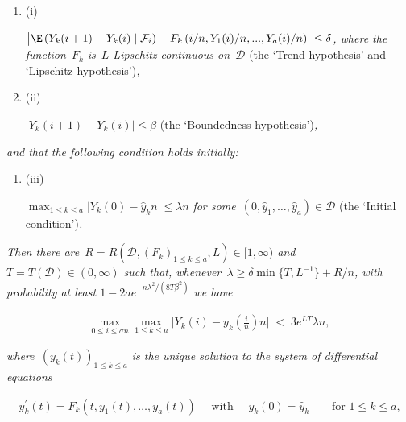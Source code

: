 \documentclass[10pt,a4paper]{article}
\begin{document}
\begin{enumerate}


\item[] (i) 


$\bigl|\E\left(Y_{k}(i+1)-Y_{k}(i)\mid\mathcal{F}_{i}\right)-F_{k}\left(i/n,Y_{1}(i)/n,...,Y_{a}(i)/n\right)\bigr|\leq\delta$\emph{,
where the function }$F_{k}$\emph{ is }$L$\emph{-Lipschitz-continuous on }$\mathcal{D}$\emph{  }(the ‘Trend hypothesis’ and ‘Lipschitz hypothesis’)\emph{,}\par




\item[] (ii) 


$\bigl|Y_{k}(i+1)-Y_{k}(i)\bigr|\leq\beta$\emph{  }(the ‘Boundedness hypothesis’)\emph{,}\par




\end{enumerate}


\emph{and that the following condition holds initially:}\par


\begin{enumerate}


\item[] (iii) 


$\max_{1\leq k\leq a}\bigl|Y_{k}(0)-\hat{y}_{k}n\bigr|\leq\lambda n$\emph{ for some }$(0,\hat{y}_{1},\ldots,\hat{y}_{a})\in\mathcal{D}$\emph{
 }(the ‘Initial condition’)\emph{.}\par




\end{enumerate}


\emph{Then there are $R=R(\mathcal{D},(F_{k})_{1\leq k\leq a},L)\in[1,\infty)$ and $T=T(\mathcal{D})\in(0,\infty)$ such that,
whenever $\lambda\geq\delta\min\{T,L^{-1}\}+R/n$,
with probability at least $1-2ae^{-n\lambda^{2}/(8T\beta^{2})}$ we have}\par


\[\begin{gathered}
\max_{0\leq i\leq\sigma n}\max_{1\leq k\leq a}\bigl|Y_{k}(i)-y_{k}\left(\tfrac{i}{n}\right)n\bigr|\;<\;3e^{LT}\lambda n,
\end{gathered}\]


\emph{where $(y_{k}(t))_{1\leq k\leq a}$ is the unique solution to the system of differential equations}\par


\[\begin{gathered}
y^{\prime}_{k}(t)=F_{k}\left(t,y_{1}(t),\ldots,y_{a}(t)\right)\quad\text{ with }\quad y_{k}(0)=\hat{y}_{k}\qquad\text{for~$1\leq k\leq a$,}
\end{gathered}\]
\end{document}
